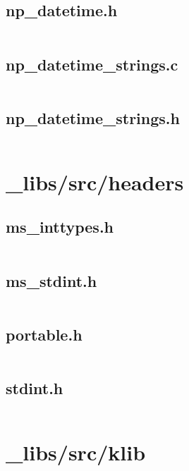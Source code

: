 \documentclass{article}
\begin{document}
\subsection{np\_datetime.h}
\inputminted{c}{/home/dufferzafar/dev/@clones/pandas/pandas/_libs/src/datetime/np_datetime.h}
\newpage

\subsection{np\_datetime\_strings.c}
\inputminted{c}{/home/dufferzafar/dev/@clones/pandas/pandas/_libs/src/datetime/np_datetime_strings.c}
\newpage

\subsection{np\_datetime\_strings.h}
\inputminted{c}{/home/dufferzafar/dev/@clones/pandas/pandas/_libs/src/datetime/np_datetime_strings.h}
\newpage

\section{\_libs/src/headers}

\subsection{ms\_inttypes.h}
\inputminted{c}{/home/dufferzafar/dev/@clones/pandas/pandas/_libs/src/headers/ms_inttypes.h}
\newpage

\subsection{ms\_stdint.h}
\inputminted{c}{/home/dufferzafar/dev/@clones/pandas/pandas/_libs/src/headers/ms_stdint.h}
\newpage

\subsection{portable.h}
\inputminted{c}{/home/dufferzafar/dev/@clones/pandas/pandas/_libs/src/headers/portable.h}
\newpage

\subsection{stdint.h}
\inputminted{c}{/home/dufferzafar/dev/@clones/pandas/pandas/_libs/src/headers/stdint.h}
\newpage

\section{\_libs/src/klib}
\end{document}

